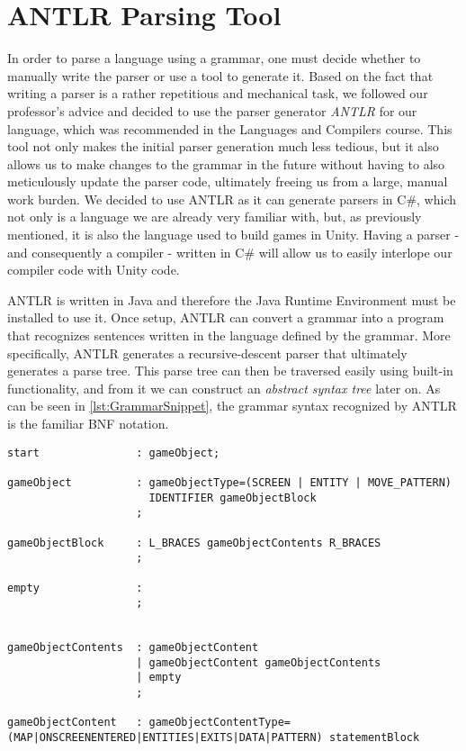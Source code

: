 \section{ANTLR Parsing Tool}\label{sec:ANTLRTool}
In order to parse a language using a grammar, one must decide whether to manually write the parser or use a tool to generate it\cite{crafting_a_compiler}.
Based on the fact that writing a parser is a rather repetitious and mechanical task, we followed our professor's advice and decided to use the parser generator \textit{ANTLR} for our language, which was recommended in the Languages and Compilers course. 
This tool not only makes the initial parser generation much less tedious, but it also allows us to make changes to the grammar in the future without having to also meticulously update the parser code, ultimately freeing us from a large, manual work burden.
We decided to use ANTLR as it can generate parsers in C\#, which not only is a language we are already very familiar with, but, as previously mentioned, it is also the language used to build games in Unity. Having a parser - and consequently a compiler - written in C\# will allow us to easily interlope our compiler code with Unity code.


ANTLR is written in Java and therefore the Java Runtime Environment must be installed to use it. 
Once setup, ANTLR can convert a grammar into a program that recognizes sentences written in the language defined by the grammar.
More specifically, ANTLR generates a recursive-descent parser that ultimately generates a parse tree.
This parse tree can then be traversed easily using built-in functionality, and from it we can construct an \textit{abstract syntax tree} later on.
As can be seen in \ref{lst:GrammarSnippet}, the grammar syntax recognized by ANTLR is the familiar BNF notation.


\begin{lstlisting}[caption={A snippet of the \dazel{} grammar used by ANTLR to generate the parser}, label={lst:GrammarSnippet}]
start				: gameObject;

gameObject          : gameObjectType=(SCREEN | ENTITY | MOVE_PATTERN) 
					  IDENTIFIER gameObjectBlock
					;
						
gameObjectBlock     : L_BRACES gameObjectContents R_BRACES
					;

empty               : 
					;


gameObjectContents  : gameObjectContent
					| gameObjectContent gameObjectContents
					| empty
					;

gameObjectContent   : gameObjectContentType=(MAP|ONSCREENENTERED|ENTITIES|EXITS|DATA|PATTERN) statementBlock 
\end{lstlisting}

